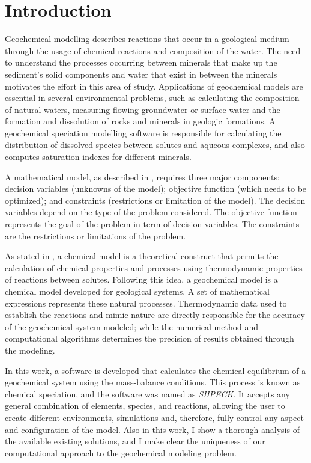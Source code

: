 \chapter{Introduction} 
\label{chapter:intro}


Geochemical modelling describes reactions that occur in a geological medium through the usage of chemical reactions and composition of the water. The need to understand the processes occurring between minerals that make up the sediment’s solid components and water that exist in between the minerals motivates the effort in this area of study. Applications of geochemical models are essential in several environmental problems, such as calculating the composition of natural waters, measuring flowing groundwater or surface water and the formation and dissolution of rocks and minerals in geologic formations. A geochemical speciation modelling software is responsible for calculating the distribution of dissolved species between solutes and aqueous complexes, and also computes saturation indexes for different minerals. 


A mathematical model, as described in \cite{Sarker:08}, requires three major components: decision variables (unknowns of the model); objective function (which needs to be optimized); and constraints (restrictions or limitation of the model). 
The decision variables depend on the type of the problem considered.  The objective function represents the goal of the problem in term of decision variables. The constraints are the restrictions or limitations of the problem.

As stated in \cite{Drever:05}, a chemical model is a theoretical construct that permits the calculation of chemical properties and processes using thermodynamic properties of reactions between solutes. Following this idea, a geochemical model is a chemical model developed for geological systems. A set of mathematical expressions represents these natural processes. Thermodynamic data used to establish the reactions and mimic nature are directly responsible for the accuracy of the geochemical system modeled; while the numerical method and computational algorithms determines the precision of results obtained through the modeling.



In this work, a software is developed that calculates the chemical equilibrium of a geochemical system using the mass-balance conditions. This process is known as chemical speciation, and the software was named as \emph{SHPECK}. It accepts any general combination of elements, species, and reactions, allowing the user to create different environments, simulations and, therefore, fully control any aspect and configuration of the model. Also in this work, I show a thorough analysis of the available existing solutions, and I make clear the uniqueness of our computational approach to the geochemical modeling problem. 

